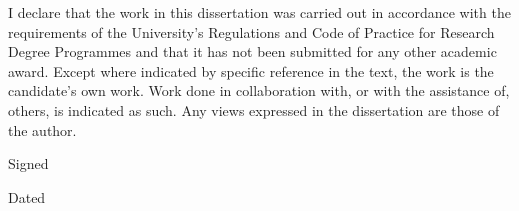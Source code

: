 \documentclass[11pt,twoside]{bristolthesis}
\begin{document}
  \begin{declaration}
    I declare that the work in this dissertation was carried out in accordance with the requirements of the University's Regulations and Code of Practice for Research Degree Programmes and that it has not been submitted for any other academic award. Except where indicated by specific reference in the text, the work is the candidate's own work. Work done in collaboration with, or with the assistance of, others, is indicated as such. Any views expressed in the dissertation are those of the author.

    \bigskip
    \bigskip
    \bigskip
    \bigskip
    \bigskip

    Signed

    \bigskip
    \bigskip
    \bigskip
    \bigskip
    \bigskip

    Dated
  \end{declaration}
  \hypersetup{linkcolor=black}
  {
  \setcounter{tocdepth}{2}
  \setcounter{secnumdepth}{2}
  \tableofcontents
  }
  \listoftables
  \listoffigures
\end{document}
